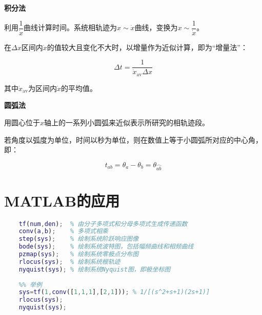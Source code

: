 \documentclass[cn, blue, normal, 12pt]{elegantnote}
\begin{document}
\textbf{积分法}

利用$\dfrac{1}{\dot{x}}$曲线计算时间。系统相轨迹为$x\sim \dot{x}$曲线，变换为$x\sim \dfrac{1}{\dot{x}}$。

在$\Delta x$区间内$\dot{x}$的值较大且变化不大时，以增量作为近似计算，即为“增量法”：

\begin{equation}
    \Delta t=\frac{1}{\dot{x}_{\mathrm{av}}\Delta x}
\end{equation}

其中$\dot{x}_{\mathrm{av}}$为区间内$\dot{x}$的平均值。

\textbf{圆弧法}

用圆心位于$x$轴上的一系列小圆弧来近似表示所研究的相轨迹段。

若角度以弧度为单位，时间以秒为单位，则在数值上等于小圆弧所对应的中心角，即：

\begin{equation}
    t_{ab}=\theta_a-\theta_b=\theta_{\wideparen{ab}}
\end{equation}

\section{MATLAB的应用}

\begin{lstlisting}[language=Matlab]
    %% 需要掌握的函数
    tf(num,den);  % 由分子多项式和分母多项式生成传递函数
    conv(a,b);    % 多项式相乘
    step(sys);    % 绘制系统阶跃响应图像
    bode(sys);    % 绘制系统波特图，包括幅频曲线和相频曲线
    pzmap(sys);   % 绘制系统零极点分布图
    rlocus(sys);  % 绘制系统根轨迹
    nyquist(sys); % 绘制系统Nyquist图，即极坐标图
    
    %% 举例
    sys=tf(1,conv([1,1,1],[2,1])); % 1/[(s^2+s+1)(2s+1)]
    rlocus(sys);
    nyquist(sys);
\end{lstlisting}
\end{document}
